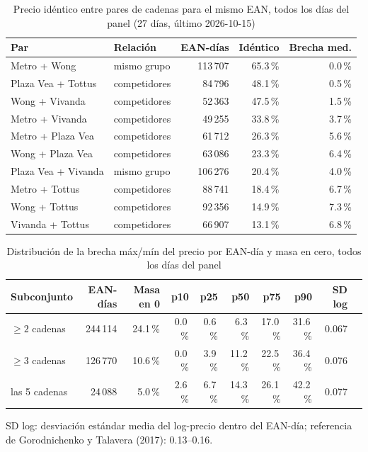 
\begin{table}[htbp]
\caption{Precio id\'entico entre pares de cadenas para el mismo EAN, todos los d\'ias del panel (27 d\'ias, \'ultimo 2026-10-15)}
\label{tab:identidad}
\centering\scriptsize\setlength{\tabcolsep}{3pt}
\begin{tabular}{@{}llrrr@{}}
\toprule
Par & Relaci\'on & EAN-d\'ias & Id\'entico & Brecha med. \\
\midrule
Metro + Wong & mismo grupo & 113\,707 & 65.3\,\% & 0.0\,\% \\
Plaza Vea + Tottus & competidores & 84\,796 & 48.1\,\% & 0.5\,\% \\
Wong + Vivanda & competidores & 52\,363 & 47.5\,\% & 1.5\,\% \\
Metro + Vivanda & competidores & 49\,255 & 33.8\,\% & 3.7\,\% \\
Metro + Plaza Vea & competidores & 61\,712 & 26.3\,\% & 5.6\,\% \\
Wong + Plaza Vea & competidores & 63\,086 & 23.3\,\% & 6.4\,\% \\
Plaza Vea + Vivanda & mismo grupo & 106\,276 & 20.4\,\% & 4.0\,\% \\
Metro + Tottus & competidores & 88\,741 & 18.4\,\% & 6.7\,\% \\
Wong + Tottus & competidores & 92\,356 & 14.9\,\% & 7.3\,\% \\
Vivanda + Tottus & competidores & 66\,907 & 13.1\,\% & 6.8\,\% \\
\bottomrule\end{tabular}\end{table}

\begin{table}[t]
\caption{Distribuci\'on de la brecha m\'ax/m\'in del precio por EAN-d\'ia y masa en cero, todos los d\'ias del panel}
\label{tab:brecha}
\centering\scriptsize\setlength{\tabcolsep}{4pt}
\begin{tabular}{@{}lrrrrrrrrr@{}}
\toprule
Subconjunto & EAN-d\'ias & Masa en 0 & p10 & p25 & p50 & p75 & p90 & SD log \\
\midrule
$\geq 2$ cadenas & 244\,114 & 24.1\,\% & 0.0\,\% & 0.6\,\% & 6.3\,\% & 17.0\,\% & 31.6\,\% & 0.067 \\
$\geq 3$ cadenas & 126\,770 & 10.6\,\% & 0.0\,\% & 3.9\,\% & 11.2\,\% & 22.5\,\% & 36.4\,\% & 0.076 \\
las 5 cadenas & 24\,088 & 5.0\,\% & 2.6\,\% & 6.7\,\% & 14.3\,\% & 26.1\,\% & 42.2\,\% & 0.077 \\
\bottomrule\end{tabular}
\par\smallskip\raggedright\scriptsize SD log: desviaci\'on est\'andar media del log-precio dentro del EAN-d\'ia; referencia de Gorodnichenko y Talavera (2017): 0.13--0.16.
\end{table}

